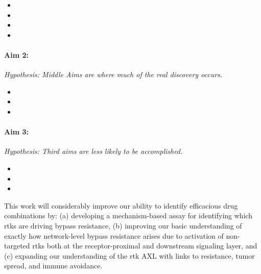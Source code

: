 \begin{itemize}[noitemsep]
	\item \SpecificAimOneA
	\item \SpecificAimOneB
	\item \SpecificAimOneC
	\item \SpecificAimOneD
\end{itemize}

\paragraph*{Aim 2: \SpecificAimTwo} \emph{Hypothesis: Middle Aims are where much of the real discovery occurs.}

\begin{itemize}[noitemsep]
	\item \SpecificAimTwoA
	\item \SpecificAimTwoB
	\item \SpecificAimTwoC
\end{itemize}

\paragraph*{Aim 3: \SpecificAimThree} \emph{Hypothesis: Third aims are less likely to be accomplished.}

\begin{itemize}[noitemsep]
	\item \SpecificAimThreeA
	\item \SpecificAimThreeB
	\item \SpecificAimThreeC
\end{itemize}

This work will considerably improve our ability to identify efficacious drug combinations by: (a) developing a mechanism-based assay for identifying which \glspl{rtk} are driving bypass resistance, (b) improving our basic understanding of exactly how network-level bypass resistance arises due to activation of non-targeted \glspl{rtk} both at the receptor-proximal and downstream signaling layer, and (c) expanding our understanding of the \gls{rtk} AXL with links to resistance, tumor spread, and immune avoidance.
